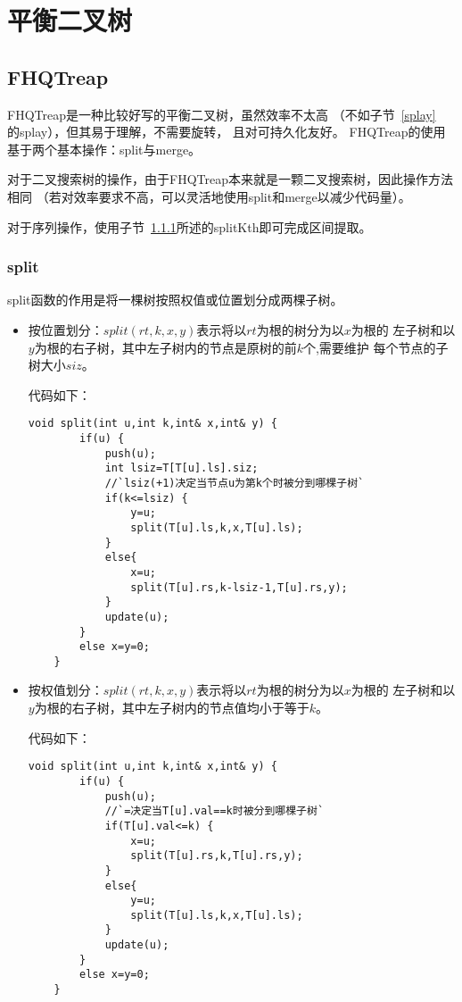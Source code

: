 \section{平衡二叉树}
\subsection{FHQTreap}\label{FHQTreap}
FHQTreap是一种比较好写的平衡二叉树，虽然效率不太高
（不如子节~\ref{splay}\\的splay），但其易于理解，不需要旋转，
且对可持久化友好。
FHQTreap的使用基于两个基本操作：split与merge。

对于二叉搜索树的操作，由于FHQTreap本来就是一颗二叉搜索树，因此操作方法相同
（若对效率要求不高，可以灵活地使用split和merge以减少代码量）。

对于序列操作，使用子节~\ref{split}所述的splitKth即可完成区间提取。

\subsubsection{split}\label{split}

split函数的作用是将一棵树按照权值或位置划分成两棵子树。

\begin{itemize}
	\item
	      按位置划分：$split(rt,k,x,y)$表示将以$rt$为根的树分为以$x$为根的
	      左子树和以$y$为根的右子树，其中左子树内的节点是原树的前$k$个,需要维护
	      每个节点的子树大小$siz$。

	      代码如下：
	      \begin{lstlisting}[title=splitKth]
    void split(int u,int k,int& x,int& y) {
        if(u) {
            push(u);
            int lsiz=T[T[u].ls].siz;
            //`lsiz(+1)决定当节点u为第k个时被分到哪棵子树`
            if(k<=lsiz) {
                y=u;
                split(T[u].ls,k,x,T[u].ls);
            }
            else{
                x=u;
                split(T[u].rs,k-lsiz-1,T[u].rs,y);
            }
            update(u);
        }
        else x=y=0;
    }
\end{lstlisting}
	\item
	      按权值划分：$split(rt,k,x,y)$表示将以$rt$为根的树分为以$x$为根的
	      左子树和以$y$为根的右子树，其中左子树内的节点值均小于等于$k$。

	      代码如下：
	      \begin{lstlisting}[title=splitKey]
    void split(int u,int k,int& x,int& y) {
        if(u) {
            push(u);
            //`=决定当T[u].val==k时被分到哪棵子树`
            if(T[u].val<=k) {
                x=u;
                split(T[u].rs,k,T[u].rs,y);
            }
            else{
                y=u;
                split(T[u].ls,k,x,T[u].ls);
            }
            update(u);
        }
        else x=y=0;
    }
\end{lstlisting}
\end{itemize}

